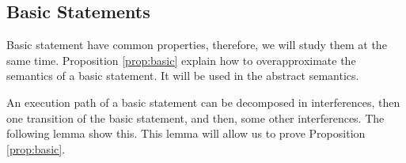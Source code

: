\documentclass[12pt]{article}
\begin{document}
\subsection{Basic Statements}

Basic statement have common properties, therefore, we will study them at the same time.
Proposition \ref{prop:basic} explain how to overapproximate the semantics of a basic statement.
It will be used in the abstract semantics.





An execution path of a basic statement can be decomposed in interferences, then one transition of the basic statement, and then, some other interferences.
The following lemma show this.
This lemma will allow us to prove Proposition \ref{prop:basic}.
\end{document}
